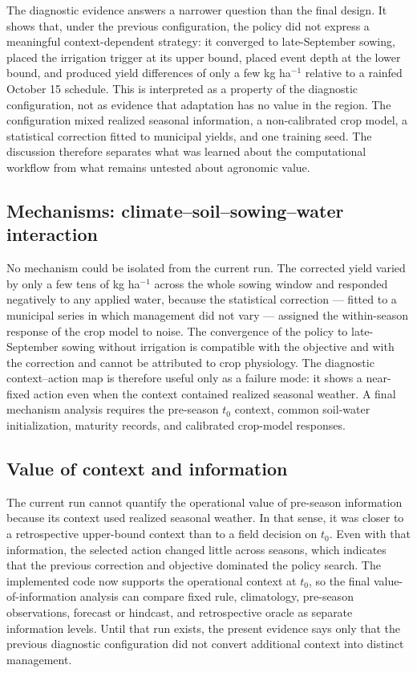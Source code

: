 \documentclass[times,final,authoryear]{elsarticle}
\begin{document}
The diagnostic evidence answers a narrower question than the final design. It shows that, under the previous configuration, the policy did not express a meaningful context-dependent strategy: it converged to late-September sowing, placed the irrigation trigger at its upper bound, placed event depth at the lower bound, and produced yield differences of only a few kg ha$^{-1}$ relative to a rainfed October 15 schedule. This is interpreted as a property of the diagnostic configuration, not as evidence that adaptation has no value in the region. The configuration mixed realized seasonal information, a non-calibrated crop model, a statistical correction fitted to municipal yields, and one training seed. The discussion therefore separates what was learned about the computational workflow from what remains untested about agronomic value.

\subsection{Mechanisms: climate--soil--sowing--water interaction}
\label{subdisc_mechanisms}

No mechanism could be isolated from the current run. The corrected yield varied by only a few tens of kg ha$^{-1}$ across the whole sowing window and responded negatively to any applied water, because the statistical correction --- fitted to a municipal series in which management did not vary --- assigned the within-season response of the crop model to noise. The convergence of the policy to late-September sowing without irrigation is compatible with the objective and with the correction and cannot be attributed to crop physiology. The diagnostic context--action map is therefore useful only as a failure mode: it shows a near-fixed action even when the context contained realized seasonal weather. A final mechanism analysis requires the pre-season $t_0$ context, common soil-water initialization, maturity records, and calibrated crop-model responses.

\subsection{Value of context and information}
\label{subdisc_information}

The current run cannot quantify the operational value of pre-season information because its context used realized seasonal weather. In that sense, it was closer to a retrospective upper-bound context than to a field decision on $t_0$. Even with that information, the selected action changed little across seasons, which indicates that the previous correction and objective dominated the policy search. The implemented code now supports the operational context at $t_0$, so the final value-of-information analysis can compare fixed rule, climatology, pre-season observations, forecast or hindcast, and retrospective oracle as separate information levels. Until that run exists, the present evidence says only that the previous diagnostic configuration did not convert additional context into distinct management.
\end{document}
